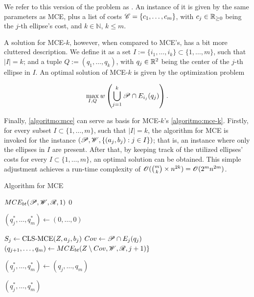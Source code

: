 We refer to this version of the problem as  . An instance of it is given by the same parameters as MCE, plus a list of costs $\mathscr{C}=\{c_1, \dots, c_m\}$, with $c_j\in\mathbb{R}_{\ge0}$ being the $j$-th ellipse's cost, and $k\in\mathbb{N}$, $k\le m$.

 A solution for MCE-$k$, however,  when compared to MCE's, has a bit more cluttered description. We define it as a set $I:=\{i_1, \dots, i_k\}\subset\{1, \dots, m\}$, such that $|I|=k$; and a tuple $Q:=(q_1, \dots, q_k)$, with $q_j\in\mathbb{R}^2$ being the center of the $j$-th ellipse in $I$. An optimal solution of MCE-$k$ is given by the optimization problem

\begin{equation*}
\max_{I, Q} w\left(\bigcup_{j=1}^k \mathscr{P} \cap E_{i_j}(q_j)\right).
\end{equation*}

Finally, \autoref{algoritmo:mce} can serve as basis for MCE-$k$'s \autoref{algoritmo:mce-k}. 
Firstly, for every subset $I \subset \{1, \dots, m\}$, such that $|I| = k$, the algorithm for MCE is invoked for the instance $(\mathscr{P}, \mathscr{W}, \{(a_j, b_j) : j \in I\})$; that is, an instance where only the ellipses in $I$ are present.
After that, by keeping track of the utilized ellipses' costs for every $I \subset \{1, \dots, m\}$, an optimal solution can be obtained.
This simple adjustment achieves a run-time complexity of $\mathscr{O}(\binom{m}{k} \times n^{2k}) = \mathscr{O}(2^mn^{2m})$. 

\begin{algoritmo}
    \caption{Algorithm for MCE}\label{algoritmo:mce}
    
    \begin{algorithmic}[1]
        
        
        \item[]
	    \State \Return $MCE_{bt}(\mathscr{P}, \mathscr{W}, \mathscr{R}, 1)$
        \EndProcedure
        \State
        \State \Return $0$
        \EndIf
        
        \State $(q_j^*, \dots, q_m^*) \gets (0, \dots, 0)$

        \State $S_j \gets \textnormal{CLS-MCE}(Z, a_j, b_j)$
        \State $Cov \gets \mathscr{P} \cap E_j(q_j)$
        \State $(q_{j+1}, \dots, q_m) \gets MCE_{bt}(Z \setminus Cov, \mathscr{W}, \mathscr{R}, j+1)\}$
        
        \State $(q_j^*, \dots, q_m^*) \gets(q_j, \dots, q_m)$
        \EndIf
        \EndFor

        \State \Return $(q_j^*, \dots, q_m^*)$
        \EndProcedure
    \end{algorithmic}
\end{algoritmo}

